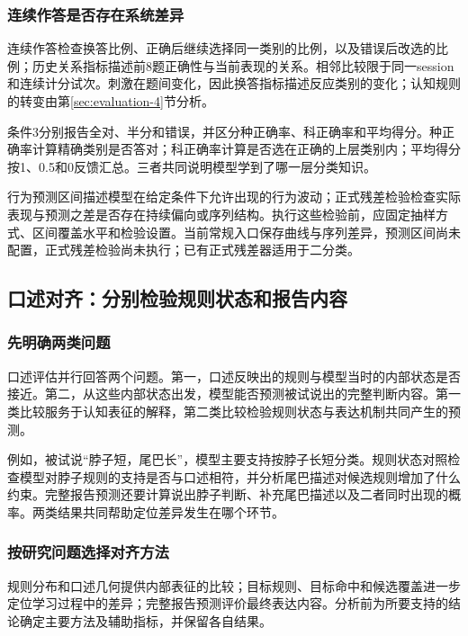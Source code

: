 \documentclass[12pt]{article}
\begin{document}
\subsubsection{连续作答是否存在系统差异}

连续作答检查换答比例、正确后继续选择同一类别的比例，以及错误后改选的比例；历史关系指标描述前8题正确性与当前表现的关系。相邻比较限于同一session和连续计分试次。刺激在题间变化，因此换答指标描述反应类别的变化；认知规则的转变由第\ref{sec:evaluation-4}节分析。

条件3分别报告全对、半分和错误，并区分种正确率、科正确率和平均得分。种正确率计算精确类别是否答对；科正确率计算是否选在正确的上层类别内；平均得分按1、0.5和0反馈汇总。三者共同说明模型学到了哪一层分类知识。

行为预测区间描述模型在给定条件下允许出现的行为波动；正式残差检验检查实际表现与预测之差是否存在持续偏向或序列结构。执行这些检验前，应固定抽样方式、区间覆盖水平和检验设置。当前常规入口保存曲线与序列差异，预测区间尚未配置，正式残差检验尚未执行；已有正式残差器适用于二分类。

\subsection{口述对齐：分别检验规则状态和报告内容}
\label{sec:evaluation-3}

\subsubsection{先明确两类问题}

口述评估并行回答两个问题。第一，口述反映出的规则与模型当时的内部状态是否接近。第二，从这些内部状态出发，模型能否预测被试说出的完整判断内容。第一类比较服务于认知表征的解释，第二类比较检验规则状态与表达机制共同产生的预测。

例如，被试说“脖子短，尾巴长”，模型主要支持按脖子长短分类。规则状态对照检查模型对脖子规则的支持是否与口述相符，并分析尾巴描述对候选规则增加了什么约束。完整报告预测还要计算说出脖子判断、补充尾巴描述以及二者同时出现的概率。两类结果共同帮助定位差异发生在哪个环节。

\subsubsection{按研究问题选择对齐方法}

规则分布和口述几何提供内部表征的比较；目标规则、目标命中和候选覆盖进一步定位学习过程中的差异；完整报告预测评价最终表达内容。分析前为所要支持的结论确定主要方法及辅助指标，并保留各自结果。
\end{document}
